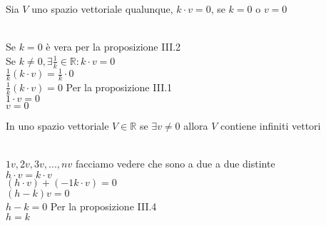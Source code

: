 \begin{proposizione}
	Sia $V$ uno spazio vettoriale qualunque, $k\cdot v=0$, se $k=0$ o $v=0$\\
	\begin{dimostrazione}
		\phantom{}\\
		Se $k=0$ è vera per la proposizione III.2\\
		Se $k\neq0, \exists \frac{1}{k}\in\mathbb{R}: k\cdot v=0$\\
		$\frac{1}{k}(k\cdot v)=\frac{1}{k}\cdot 0$\\
		$\frac{1}{k}(k\cdot v)=0$ Per la proposizione III.1\\
		$1\cdot v=0$\\
		$v=0$
	\end{dimostrazione}
\end{proposizione}

\begin{proposizione}
	In uno spazio vettoriale $V\in\mathbb{R}$ se $\exists v\neq 0$ allora $V$ contiene infiniti vettori\\
	\begin{dimostrazione}
		\phantom{}\\
		$1v, 2v, 3v,..., nv$ facciamo vedere che sono a due a due distinte\\
		$h\cdot v=k\cdot v$\\
		$(h\cdot v)+(-1k\cdot v)=0$\\
		$(h-k)v=0$\\
		$h-k=0$ Per la proposizione III.4\\
		$h=k$
	\end{dimostrazione}
\end{proposizione}

